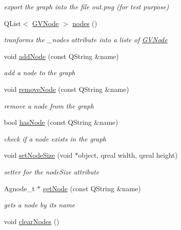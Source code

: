 \begin{DoxyCompactItemize}
\begin{DoxyCompactList}\small\item\em export the graph into the file out.\+png (for test purpose) \end{DoxyCompactList}\item 
Q\+List$<$ \hyperlink{structGVNode}{G\+V\+Node} $>$ \hyperlink{classGVSkeletonGraph_ac74f8e4b5ad9f207a35eb2696b5740b6}{nodes} ()
\begin{DoxyCompactList}\small\item\em tranforms the \+\_\+nodes attribute into a liste of \hyperlink{structGVNode}{G\+V\+Node} \end{DoxyCompactList}\item 
void \hyperlink{classGVSkeletonGraph_a51513245defe5f4fe3d63b3abc3a220a}{add\+Node} (const Q\+String \&name)
\begin{DoxyCompactList}\small\item\em add a node to the graph \end{DoxyCompactList}\item 
void \hyperlink{classGVSkeletonGraph_a5360f1d472f7c548bcba0b7554dca649}{remove\+Node} (const Q\+String \&name)
\begin{DoxyCompactList}\small\item\em remove a node from the graph \end{DoxyCompactList}\item 
bool \hyperlink{classGVSkeletonGraph_a3488e1b4a133b330835c3c0be7caeedf}{has\+Node} (const Q\+String \&name)
\begin{DoxyCompactList}\small\item\em check if a node exists in the graph \end{DoxyCompactList}\item 
void \hyperlink{classGVSkeletonGraph_a3a283e888b23d526974f860241f8b1cf}{set\+Node\+Size} (void $\ast$object, qreal width, qreal height)
\begin{DoxyCompactList}\small\item\em setter for the node\+Size attribute \end{DoxyCompactList}\item 
Agnode\+\_\+t $\ast$ \hyperlink{classGVSkeletonGraph_adce1790e44da056309d142e153cb5a24}{get\+Node} (const Q\+String \&name)
\begin{DoxyCompactList}\small\item\em gets a node by its name \end{DoxyCompactList}\item 
\hypertarget{classGVSkeletonGraph_a3c1d531da3434485a6556e59c01cf2b5}{void \hyperlink{classGVSkeletonGraph_a3c1d531da3434485a6556e59c01cf2b5}{clear\+Nodes} ()}\label{classGVSkeletonGraph_a3c1d531da3434485a6556e59c01cf2b5}


\end{DoxyCompactItemize}
